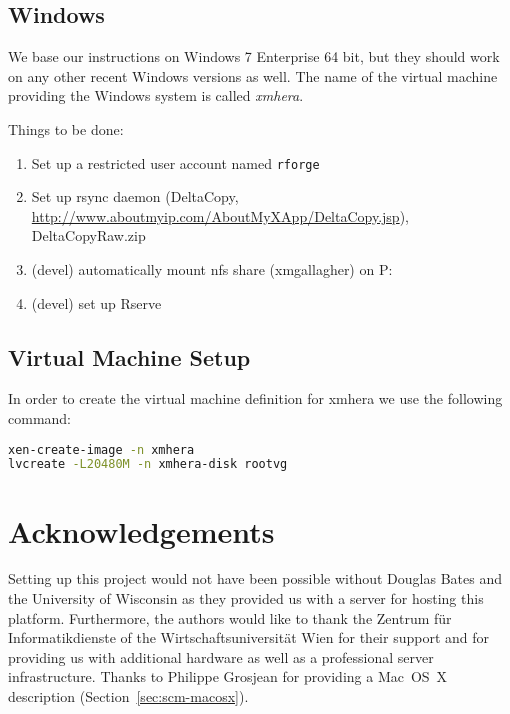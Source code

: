 \documentclass[a4paper]{article}
\let\code=\texttt
\begin{document}
\subsection{Windows}
We base our instructions on Windows 7 Enterprise 64 bit, but they
should work on any other recent Windows versions as well. The name of
the virtual machine providing the Windows system is called
\textit{xmhera}.

Things to be done:
\begin{enumerate}
\item Set up a restricted user account named \code{rforge}
\item Set up rsync daemon (DeltaCopy,
  \url{http://www.aboutmyip.com/AboutMyXApp/DeltaCopy.jsp}), DeltaCopyRaw.zip
\item (devel) automatically mount nfs share (xmgallagher) on P:
\item (devel) set up Rserve
\end{enumerate}

\subsection{Virtual Machine Setup}

In order to create the virtual machine definition for xmhera we use
the following command:

\begin{lstlisting}[frame=single, framerule=0.95pt, language=bash]
xen-create-image -n xmhera
lvcreate -L20480M -n xmhera-disk rootvg
\end{lstlisting}


\section{Acknowledgements}

Setting up this project would not have been possible without Douglas
Bates and the University of Wisconsin as they provided us with a
server for hosting this platform. Furthermore, 
the authors would like to thank the Zentrum f\"ur Informatikdienste  
of the Wirtschaftsuniversit\"at Wien for
their support and for providing us with additional hardware as well as a
professional server infrastructure. 
Thanks to Philippe Grosjean for
providing a Mac~OS~X description (Section~\ref{sec:scm-macosx}).



\end{document}
